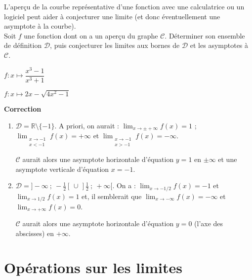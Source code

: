 \documentclass{cornouaille}
\begin{document}
\begin{remarque}
L'aperçu de la courbe représentative d'une fonction avec une  calculatrice ou un logiciel peut aider à conjecturer une limite (et donc éventuellement une asymptote  à la courbe).\\

Soit $f$ une fonction dont on a un aperçu du graphe $\mathcal{C}$. Déterminer son ensemble de définition $\mathcal{D}$, puis conjecturer les limites aux bornes de $\mathcal{D}$ et les  asymptotes à $\mathcal{C}$.
\begin{colenumerate}{2}
\item $f:x\mapsto \dfrac{x^3-1}{x^3+1}$\par
\item $f:x\mapsto 2x-\sqrt{4x^2-1}$ \par
\end{colenumerate}

\end{remarque}  

\textbf{Correction}

  \begin{enumerate}
  \item  $\mathcal{D}=\mathbb{R}\setminus\{-1\}$. A priori, on aurait : $\lim_{x\to\pm+\infty}f(x)=1$ ; $\lim_{\substack{x\to -1\\ x<-1}}f(x)=+\infty$ et $\lim_{\substack{x\to -1\\ x>-1}}f(x)=-\infty$.\par
        $\mathcal{C}$ aurait alors une asymptote  horizontale d'équation $y=1$ en $\pm\infty$ et une asymptote verticale d'équation $x=-1$.
  \item  $\mathcal{D}=]-\infty~;~-\tfrac{1}{2}[\,\cup\,]\tfrac{1}{2}~;~+\infty[$. On a : $\lim_{x\to -1/2}f(x)=-1$ et $\lim_{x\to 1/2}f(x)=1$ et, il semblerait que $\lim_{x\to-\infty}f(x)=-\infty$ et $\lim_{x\to +\infty}f(x)=0$.\par
        $\mathcal{C}$ aurait alors une asymptote horizontale d'équation $y=0$ (l'axe des abscisses) en $+\infty$.\par
         
  \end{enumerate}
  

\section{Opérations sur les limites}
\end{document}
